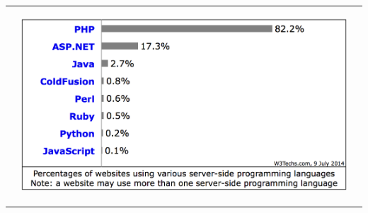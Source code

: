 \documentclass[17pt, a1paper, portrait, margin=0mm, innermargin=15mm,
     blockverticalspace=15mm, colspace=15mm, subcolspace=8mm]{tikzposter}
\begin{document}
\begin{columns}
{\begin{tabular}[t]{ccc}
			&
			
			\begin{minipage}[c]{0.5\linewidth}			
			\begin{center}
				\includegraphics[scale=0.63]{img/percentage.png}
			\end{center}
		
			

			\end{minipage}
			
		\end{tabular}
		\vspace{17pt}
	}		
			
	\end{columns}
	
\end{document}
